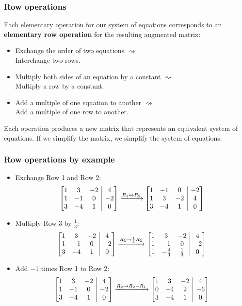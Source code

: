 \documentclass[12pt,t]{beamer}
\makeatletter
\newenvironment{amatrix}[1]{%
  \left[\begin{array}{@{}*{#1}{c}|c@{}}
}{%
  \end{array}\right]
}
\makeatother
\begin{document}
\begin{frame}\frametitle{Row operations}
 Each elementary operation for our system of equations corresponds to an {\bf elementary row operation} for the resulting augmented matrix:
\begin{itemize}
 \item Exchange the order of two equations $\rightsquigarrow$\\
\alert{Interchange two rows.}
 \item Multiply both sides of an equation by a constant $\rightsquigarrow$\\
\alert{ Multiply a row by a constant.}
 \item Add a multiple of one equation to another $\rightsquigarrow$\\
\alert{ Add a multiple of one row to another.}
\end{itemize}
Each operation produces a new matrix that represents an equivalent system of equations. If we simplify the matrix, we simplify the system of equations.
\end{frame}
\begin{frame}\frametitle{Row operations by example}
\begin{itemize}
 \item Exchange Row 1 and Row 2:
\[
 \begin{amatrix}{3}
  1&3&-2&4\\1&-1&0&-2\\3&-4&1&0
 \end{amatrix}\xrightarrow[]{R_1\leftrightarrow R_2}
\begin{amatrix}{3}
  1&-1&0&-2\\1&3&-2&4\\3&-4&1&0
 \end{amatrix}
\]
\item Multiply Row 3 by $\frac{1}{3}$:
\[
 \begin{amatrix}{3}
  1&3&-2&4\\1&-1&0&-2\\3&-4&1&0
 \end{amatrix}\xrightarrow[]{R_3\rightarrow \frac{1}{3}R_3}
\begin{amatrix}{3}
   1&3&-2&4\\1&-1&0&-2\\1&-\frac{4}{3}&\frac{1}{3}&0
 \end{amatrix}
\]
\item Add $-1$ times Row 1 to Row 2:
 \[
\begin{amatrix}{3}
  1&3&-2&4\\1&-1&0&-2\\3&-4&1&0
 \end{amatrix}\xrightarrow[]{R_2\rightarrow R_2-R_1}
\begin{amatrix}{3}
  1&3&-2&4\\0&-4&2&-6\\3&-4&1&0
 \end{amatrix}
 \]
\end{itemize}
\end{frame}
\end{document}
